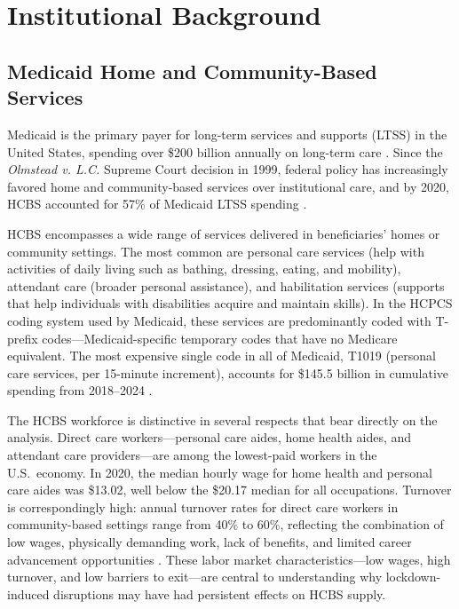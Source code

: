 \documentclass[12pt]{article}
\begin{document}
\section{Institutional Background}

\subsection{Medicaid Home and Community-Based Services}

Medicaid is the primary payer for long-term services and supports (LTSS) in the United States, spending over \$200 billion annually on long-term care \citep{cms2024ltss}. Since the \textit{Olmstead v. L.C.} Supreme Court decision in 1999, federal policy has increasingly favored home and community-based services over institutional care, and by 2020, HCBS accounted for 57\% of Medicaid LTSS spending \citep{eiken2018}.

HCBS encompasses a wide range of services delivered in beneficiaries' homes or community settings. The most common are personal care services (help with activities of daily living such as bathing, dressing, eating, and mobility), attendant care (broader personal assistance), and habilitation services (supports that help individuals with disabilities acquire and maintain skills). In the HCPCS coding system used by Medicaid, these services are predominantly coded with T-prefix codes---Medicaid-specific temporary codes that have no Medicare equivalent. The most expensive single code in all of Medicaid, T1019 (personal care services, per 15-minute increment), accounts for \$145.5 billion in cumulative spending from 2018--2024 \citep{hhs2026tmsis}.

The HCBS workforce is distinctive in several respects that bear directly on the analysis. Direct care workers---personal care aides, home health aides, and attendant care providers---are among the lowest-paid workers in the U.S.\ economy. In 2020, the median hourly wage for home health and personal care aides was \$13.02, well below the \$20.17 median for all occupations. Turnover is correspondingly high: annual turnover rates for direct care workers in community-based settings range from 40\% to 60\%, reflecting the combination of low wages, physically demanding work, lack of benefits, and limited career advancement opportunities \citep{scales2020, phiinc2021}. These labor market characteristics---low wages, high turnover, and low barriers to exit---are central to understanding why lockdown-induced disruptions may have had persistent effects on HCBS supply.
\end{document}
